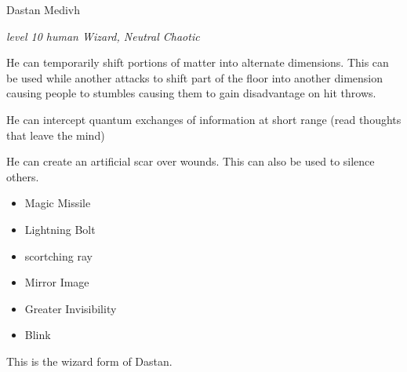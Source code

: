 \begin{monsterbox}{Dastan Medivh}
	\begin{hangingpar}
		\textit{level 10 human Wizard, Neutral Chaotic}
	\end{hangingpar}
	\dndline%
	\basics[%
	armorclass = 14,
	hitpoints  = 72,
	speed      = 25 ft
	]
	\dndline%
	\stats[
	STR = \stat{8}, %
	DEX = \stat{13},
	CON = \stat{14},
	INT = \stat{20},
	WIS = \stat{16},
	CHA = \stat{12}
	]
	\dndline%
	\details[%
	languages = {Common, Elvish, Dwarvish, Gnomish, Halfling, Celestial, Draconic, Primordial},
	challenge = 10
	]
	\dndline%
	\begin{monsteraction}
		He can temporarily shift portions of matter into alternate dimensions. This can be used while another attacks to shift part of the floor into another dimension causing people to stumbles causing them to gain disadvantage on hit throws.
	\end{monsteraction}	
	\begin{monsteraction}
		He can intercept quantum exchanges of information at short range (read thoughts that leave the mind)
	\end{monsteraction}	
	\begin{monsteraction}
		He can create an artificial scar over wounds. This can also be used to silence others.
	\end{monsteraction}	
	\begin{monsteraction}[Spells]
		\begin{itemize}
			\item Magic Missile
			\item Lightning Bolt
			\item scortching ray
			\item Mirror Image
			\item Greater Invisibility
			\item Blink
		\end{itemize}
	\end{monsteraction}
		This is the wizard form of Dastan.
\end{monsterbox}

